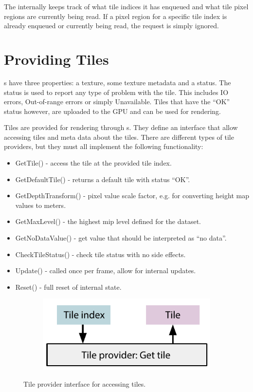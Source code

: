 The  internally keeps track of what tile indices it has enqueued and what tile pixel regions are currently being read. If a pixel region for a specific tile index is already enqueued or currently being read, the request is simply ignored. 


\section{Providing Tiles}
s have three properties: a texture, some texture metadata and a status. The status is used to report any type of problem with the tile. This includes IO errors, Out-of-range errors or simply Unavailable. Tiles that have the ``OK'' status however, are uploaded to the GPU and can be used for rendering. 

Tiles are provided for rendering through s. They define an interface that allow accessing tiles and meta data about the tiles. There are different types of tile providers, but they must all implement the following functionality:

\begin{itemize}
\item GetTile() - access the tile at the provided tile index.
\item GetDefaultTile() - returns a default tile with status ``OK''.
\item GetDepthTransform() - pixel value scale factor, e.g. for converting height map values to meters.
\item GetMaxLevel() - the highest mip level defined for the dataset.
\item GetNoDataValue() - get value that should be interpreted as ``no data''.
\item CheckTileStatus() - check tile status with no side effects.
\item Update() - called once per frame, allow for internal updates.
\item Reset() - full reset of internal state.
\end{itemize}

\begin{figure}[htbp]
    \centering
    \begin{subfigure}[bt]{0.4\textwidth}
        \includegraphics[width=\textwidth]{figures/implementation/tileprovider/tileprovider_gettile.pdf}
    \end{subfigure}
    \caption{Tile provider interface for accessing tiles.}
    \label{fig:tileprovider}
\end{figure}

